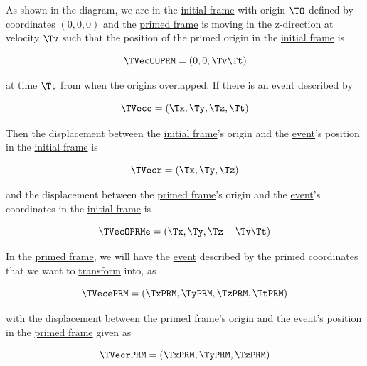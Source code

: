 As shown in the diagram, we are in the \hyperlink{def-initial-Frame}{initial frame} with origin ${\TO }$ defined by coordinates $(0,0,0)$ and the \hyperlink{def-Primed-Frame}{primed frame} is moving in the z-direction at velocity ${\Tv }$ such that the position of the primed origin in the \hyperlink{def-initial-Frame}{initial frame} is

\begin{equation}
	\TVecOOPRM  = (0,0,{\Tv }{\Tt })
\end{equation}

at time ${\Tt }$ from when the origins overlapped.
If there is an \hyperlink{def-event}{event} described by

\begin{equation}
	\TVece  = ({\Tx },{\Ty },{\Tz },{\Tt })
\end{equation}

Then the displacement between the \hyperlink{def-initial-Frame}{initial frame}'s origin and the \hyperlink{def-event}{event}'s position in the \hyperlink{def-initial-Frame}{initial frame} is

\begin{equation}
	\TVecr  = ({\Tx },{\Ty },{\Tz })
\end{equation}

and the displacement between the \hyperlink{def-Primed-Frame}{primed frame}'s origin and the \hyperlink{def-event}{event}'s coordinates in the \hyperlink{def-initial-Frame}{initial frame} is

\begin{equation}
	\TVecOPRMe = ({\Tx },{\Ty },{\Tz }-{\Tv }{\Tt })
\end{equation}

In the \hyperlink{def-Primed-Frame}{primed frame}, we will have the \hyperlink{def-event}{event} described by the primed coordinates that we want to \hyperlink{def-transform}{transform} into, as

\begin{equation}
	\TVecePRM  = ({\TxPRM  },{\TyPRM  },{\TzPRM  },\TtPRM )
\end{equation}

with the displacement between the \hyperlink{def-Primed-Frame}{primed frame}'s origin and the \hyperlink{def-event}{event}'s position in the \hyperlink{def-Primed-Frame}{primed frame} given as

\begin{equation}
	{\TVecrPRM  } = ({\TxPRM  },{\TyPRM  },{\TzPRM  })
\end{equation}


